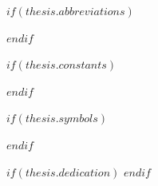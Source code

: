 \setlength{\cftsecindent}{0.5em}        %
\setlength{\cftsubsecindent}{1em}       %
\setlength{\cftsubsubsecindent}{1.5em}  %
\renewcommand{\cftfigpresnum}{Figure~}
\renewcommand{\cfttabpresnum}{Table~}
\renewcommand{\cftfigaftersnum}{:~}  %
\renewcommand{\cfttabaftersnum}{:~}  %
\setlength{\cftbeforefigskip}{0.5em}  %
\setlength{\cftbeforetabskip}{0.5em} %
\setlength{\cftfignumwidth}{5em} %
\setlength{\cfttabnumwidth}{5em} %
\setlength{\cftfigindent}{0em}    %
\setlength{\cfttabindent}{0em}    %

\begingroup
\hypersetup{linkcolor=$if(toclinkcolor)$$toclinkcolor$$else$black$endif$}

\tableofcontents  
\clearpage
\clearpage%
\listoffigures
\clearpage
\clearpage
\clearpage  %
\listoftables       %
\clearpage
\clearpage
\endgroup

$if(thesis.abbreviations)$
  
$endif$

$if(thesis.constants)$
  
$endif$

$if(thesis.symbols)$
  
$endif$

$if(thesis.dedication)$
  \dedicatory{} 
$endif$

\mainmatter %

\pagestyle{thesis}
